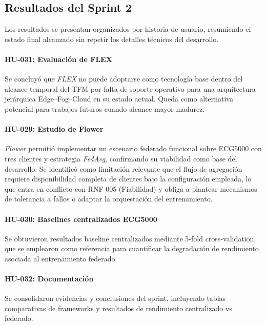 \documentclass{report}
\begin{document}
\subsection{Resultados del Sprint 2}

Los resultados se presentan organizados por historia de usuario, resumiendo el estado final alcanzado sin repetir los detalles técnicos del desarrollo.

\paragraph{HU-031: Evaluación de FLEX}
Se concluyó que \emph{FLEX} no puede adoptarse como tecnología base dentro del alcance temporal del TFM por falta de soporte operativo para una arquitectura jerárquica Edge--Fog--Cloud en su estado actual. Queda como alternativa potencial para trabajos futuros cuando alcance mayor madurez.

\paragraph{HU-029: Estudio de Flower}
\textit{Flower} permitió implementar un escenario federado funcional sobre ECG5000 con tres clientes y estrategia \textit{FedAvg}, confirmando su viabilidad como base del desarrollo. Se identificó como limitación relevante que el flujo de agregación requiere disponibilidad completa de clientes bajo la configuración empleada, lo que entra en conflicto con RNF-005 (Fiabilidad) y obliga a plantear mecanismos de tolerancia a fallos o adaptar la orquestación del entrenamiento.

\paragraph{HU-030: Baselines centralizados ECG5000}
Se obtuvieron resultados baseline centralizados mediante 5-fold cross-validation, que se emplearon como referencia para cuantificar la degradación de rendimiento asociada al entrenamiento federado.

\paragraph{HU-032: Documentación}
Se consolidaron evidencias y conclusiones del sprint, incluyendo tablas comparativas de frameworks y resultados de rendimiento centralizado vs federado.
\end{document}
